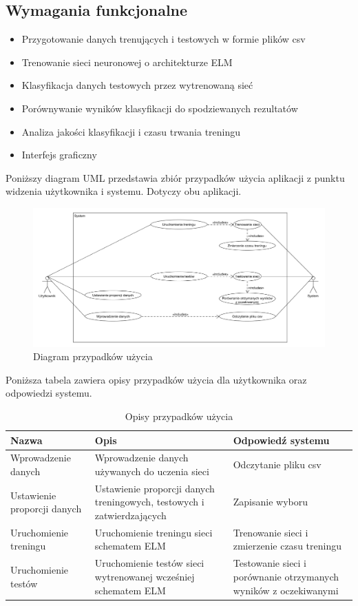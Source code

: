 \documentclass{article}
\begin{document}
\subsection{Wymagania funkcjonalne}
\begin{itemize}
\item Przygotowanie danych trenujących i testowych w formie plików csv
\item Trenowanie sieci neuronowej o architekturze ELM
\item Klasyfikacja danych testowych przez wytrenowaną sieć
\item Porównywanie wyników klasyfikacji do spodziewanych rezultatów
\item Analiza jakości klasyfikacji i  czasu trwania treningu
\item Interfejs graficzny
\end{itemize}
Poniższy diagram UML przedstawia zbiór przypadków użycia aplikacji z punktu widzenia użytkownika i systemu. Dotyczy obu aplikacji.
\begin{figure}[H]
\hspace*{-2cm}
\includegraphics[width=16cm]{use_case.png}
\caption{Diagram przypadków użycia}
\end{figure}
Poniższa tabela zawiera opisy przypadków użycia dla użytkownika oraz odpowiedzi systemu.

\begin{table}[H]
\caption{Opisy przypadków użycia}
\begin{tabular}{|p{3.4cm}|p{5cm}|p{4cm}|}
\hline
\textbf{Nazwa} & \textbf{Opis} & \textbf{Odpowiedź systemu} \\
\hline
Wprowadzenie danych & Wprowadzenie danych używanych do uczenia sieci & Odczytanie pliku csv \\ \hline
Ustawienie proporcji danych & Ustawienie proporcji danych treningowych, testowych i zatwierdzających & Zapisanie wyboru \\ \hline
Uruchomienie treningu & Uruchomienie treningu sieci schematem ELM & Trenowanie sieci i zmierzenie czasu treningu \\ \hline
Uruchomienie testów & Uruchomienie testów sieci wytrenowanej wcześniej schematem ELM & Testowanie sieci i porównanie otrzymanych wyników z oczekiwanymi \\
\hline
\end{tabular}
\end{table}
\clearpage
\end{document}
